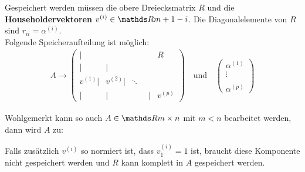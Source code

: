 



Gespeichert werden müssen die obere Dreiecksmatrix $R$ und die 
\textbf{Householdervektoren} 
$v^{(i)}\in \R{m+1-i}$.
Die Diagonalelemente von $R$ sind $r_{ii} = \alpha^{(i)}$. \\
Folgende Speicheraufteilung ist möglich:
\begin{gather*}
A \longrightarrow \left(
\begin{array}{rrrrr}
|&&& R \\
|&| \\
v^{(1)}| & v^{(2)}|&\ddots ~~\\
| &|&\phantom{v^{(i)}}|& v^{(p)}			
\end{array}
\right)
\quad \text{und} \quad 
\begin{pmatrix}
\alpha^{(1)} \\ \vdots \\ \\ \alpha^{(p)}
\end{pmatrix}
\end{gather*}

Wohlgemerkt kann so auch $A\in \R{m\times n}$ mit $m<n$ bearbeitet werden,
dann wird $A$ zu:


Falls zusätzlich $v^{(i)}$ so normiert ist,
dass $v_1^{(i)} = 1$ ist, braucht diese Komponente nicht gespeichert werden 
und $R$ kann komplett in $A$ gespeichert werden.



